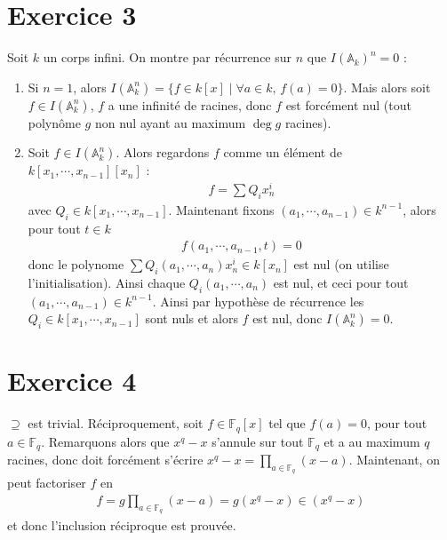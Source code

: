     \section{Exercice 3}
        \label{exo3}
        Soit $k$ un corps infini. On montre par récurrence sur $n$ que $I(\mathbb{A}_k)^n = 0$ :
        \begin{enumerate}
            \item Si $n = 1$, alors $I(\mathbb{A}_k^n) = \{f \in k[x] \mid \forall a \in k,\, f(a) = 0\}$. Mais alors soit $f \in I(\mathbb{A}_k^n)$, $f$ a une infinité de racines, donc $f$ est forcément nul (tout polynôme $g$ non nul ayant au maximum $\deg g$ racines).
            \item Soit $f \in I(\mathbb{A}_k^n)$. Alors regardons $f$ comme un élément de $k[x_1, \cdots, x_{n-1}][x_n]$ : 
            \begin{align*}
                f = \sum Q_i x_n^i
            \end{align*}
            avec $Q_i \in k[x_1, \cdots, x_{n-1}]$. Maintenant fixons $(a_1, \cdots, a_{n-1}) \in k^{n-1}$, alors pour tout $t \in k$
            \begin{align*}
                f(a_1, \cdots, a_{n-1}, t) = 0
            \end{align*}
            donc le polynome $\sum Q_i(a_1, \cdots, a_n)x_n^i \in k[x_n]$ est nul (on utilise l'initialisation). Ainsi chaque $Q_i(a_1, \cdots, a_n)$ est nul, et ceci pour tout $(a_1, \cdots, a_{n-1}) \in k^{n-1}$. Ainsi par hypothèse de récurrence les $Q_i \in k[x_1, \cdots, x_{n-1}]$ sont nuls et alors $f$ est nul, donc $I(\mathbb{A}_k^n) = 0$.
        \end{enumerate}
    
    \section{Exercice 4}
        $\supseteq$ est trivial. Réciproquement, soit $f \in \mathbb{F}_q[x]$ tel que $f(a) = 0$, pour tout $a \in \mathbb{F}_q$. Remarquons alors que $x^q - x$ s'annule sur tout $\mathbb{F}_q$ et a au maximum $q$ racines, donc doit forcément s'écrire $x^q - x = \prod_{a \in \mathbb{F}_q} (x - a)$. Maintenant, on peut factoriser $f$ en
        \begin{align*}
            f = g \prod_{a \in \mathbb{F}_q} (x - a) = g (x^q - x) \in (x^q - x)
        \end{align*}
        et donc l'inclusion réciproque est prouvée.

